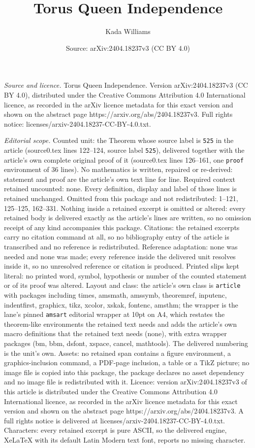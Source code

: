 \documentclass[10pt,a4paper]{amsart}
\title[Torus Queen Independence]{Torus Queen Independence}
\author{Kada Williams}
\date{Source: arXiv:2404.18237v3 (CC BY 4.0)}
\begin{document}
\maketitle

\noindent\emph{Source and licence.} Torus Queen Independence. Version arXiv:2404.18237v3 (CC BY 4.0), distributed under the Creative Commons Attribution 4.0 International licence, as recorded in the arXiv licence metadata for this exact version and shown on the abstract page https://arxiv.org/abs/2404.18237v3. Full rights notice: licenses/arxiv-2404.18237-CC-BY-4.0.txt.\par\smallskip

\noindent\textit{Editorial scope.} Counted unit: the Theorem whose source label is \texttt{525} in the article (source0.tex lines 122--124, source label \texttt{525}), delivered together with the article's own complete original proof of it (source0.tex lines 126--161, one \texttt{proof} environment of 36 lines). No mathematics is written, repaired or re-derived: statement and proof are the article's own text line for line. Required context retained uncounted: none. Every definition, display and label of those lines is retained unchanged. Omitted from this package and not redistributed: 1--121, 125--125, 162--331. Nothing inside a retained excerpt is omitted or altered: every retained body is delivered exactly as the article's lines are written, so no omission receipt of any kind accompanies this package. Citations: the retained excerpts carry no citation command at all, so no bibliography entry of the article is transcribed and no reference is redistributed. Reference adaptation: none was needed and none was made; every reference inside the delivered unit resolves inside it, so no unresolved reference or citation is produced. Printed slips kept literal: no printed word, symbol, hypothesis or number of the counted statement or of its proof was altered. Layout and class: the article's own class is \texttt{article} with packages including times, amsmath, amssymb, theoremref, inputenc, indentfirst, graphicx, tikz, xcolor, xskak, fontenc, amsthm; the wrapper is the lane's pinned \texttt{amsart} editorial wrapper at 10pt on A4, which restates the theorem-like environments the retained text needs and adds the article's own macro definitions that the retained text needs (none), with extra wrapper packages (bm, bbm, dsfont, xspace, cancel, mathtools). The delivered numbering is the unit's own. Assets: no retained span contains a figure environment, a graphics-inclusion command, a PDF-page inclusion, a table or a TikZ picture; no image file is copied into this package, the package declares no asset dependency and no image file is redistributed with it. Licence: version arXiv:2404.18237v3 of this article is distributed under the Creative Commons Attribution 4.0 International licence, as recorded in the arXiv licence metadata for this exact version and shown on the abstract page https://arxiv.org/abs/2404.18237v3. A full rights notice is delivered at licenses/arxiv-2404.18237-CC-BY-4.0.txt. Characters: every retained excerpt is pure ASCII, so the delivered engine, XeLaTeX with its default Latin Modern text font, reports no missing character.
\end{document}
